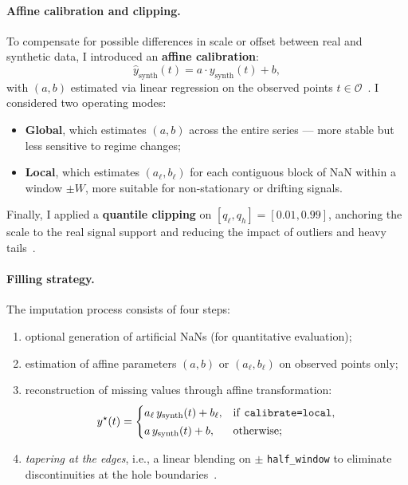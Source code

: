 \paragraph{Affine calibration and clipping.}
To compensate for possible differences in scale or offset between real and synthetic data, I introduced an \textbf{affine calibration}:
\[
\hat{y}_{\text{synth}}(t) = a \cdot y_{\text{synth}}(t) + b,
\]
with $(a,b)$ estimated via linear regression on the observed points $t \in \mathcal{O}$~\cite{han2011data}.  
I considered two operating modes:
\begin{itemize}
  \item \textbf{Global}, which estimates $(a,b)$ across the entire series — more stable but less sensitive to regime changes;
  \item \textbf{Local}, which estimates $(a_\ell,b_\ell)$ for each contiguous block of NaN within a window $\pm W$, more suitable for non-stationary or drifting signals.
\end{itemize}

Finally, I applied a \textbf{quantile clipping} on $[q_\ell,q_h] = [0.01,0.99]$, anchoring the scale to the real signal support and reducing the impact of outliers and heavy tails~\cite{little2019statistical,aggarwal2015data}.

\paragraph{Filling strategy.}
The imputation process consists of four steps:
\begin{enumerate}
  \item optional generation of artificial NaNs (for quantitative evaluation);
  \item estimation of affine parameters $(a,b)$ or $(a_\ell,b_\ell)$ on observed points only;
  \item reconstruction of missing values through affine transformation:
  \[
  y^\star(t) =
  \begin{cases}
  a_\ell\,y_{\text{synth}}(t)+b_\ell, & \text{if \texttt{calibrate=local}}, \\[2pt]
  a\,y_{\text{synth}}(t)+b, & \text{otherwise;}
  \end{cases}
  \]
  \item \emph{tapering at the edges}, i.e., a linear blending on $\pm$ \texttt{half\_window} to eliminate discontinuities at the hole boundaries~\cite{shumway2017time}.
\end{enumerate}


